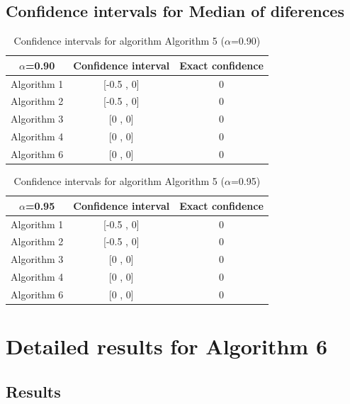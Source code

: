 \documentclass[a4paper,10pt]{article}
\begin{document}
\subsection{Confidence intervals for Median of diferences}

\begin{table}[!htp]
\centering\small
\begin{tabular}{
|c|c|c|}
\hline
 $\alpha$=0.90 & Confidence interval & Exact confidence \\ \hline 
Algorithm 1 & [-0.5 , 0] & 0\\ \hline 
Algorithm 2 & [-0.5 , 0] & 0\\ \hline 
Algorithm 3 & [0 , 0] & 0\\ \hline 
Algorithm 4 & [0 , 0] & 0\\ \hline 
Algorithm 6 & [0 , 0] & 0\\ \hline 

\end{tabular}
\caption{Confidence intervals for algorithm Algorithm 5 ($\alpha$=0.90)}
\end{table}
\begin{table}[!htp]
\centering\small
\begin{tabular}{
|c|c|c|}
\hline
 $\alpha$=0.95 & Confidence interval & Exact confidence \\ \hline 
Algorithm 1 & [-0.5 , 0] & 0\\ \hline 
Algorithm 2 & [-0.5 , 0] & 0\\ \hline 
Algorithm 3 & [0 , 0] & 0\\ \hline 
Algorithm 4 & [0 , 0] & 0\\ \hline 
Algorithm 6 & [0 , 0] & 0\\ \hline 

\end{tabular}
\caption{Confidence intervals for algorithm Algorithm 5 ($\alpha$=0.95)}
\end{table}

 \clearpage 


\section{Detailed results for Algorithm 6}


\subsection{Results}
\end{document}
